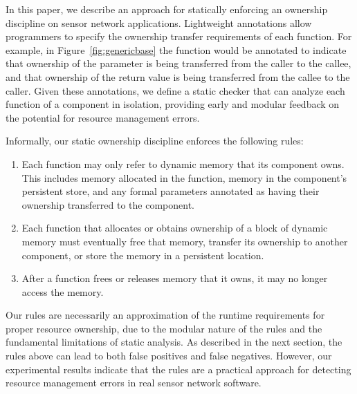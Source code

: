 
%

In this paper, we describe an approach for statically enforcing an
ownership discipline on sensor network applications.  
Lightweight annotations allow programmers to specify the ownership
transfer requirements of each function.  For example, in
Figure~\ref{fig:genericbase} the  function would be
annotated to indicate that ownership of the  parameter
is being transferred from the caller to the callee, and that ownership
of the return value is being transferred from the callee to the
caller.  Given these annotations, we define a static checker that can
analyze each function of a component in isolation, providing early and
modular feedback on the potential for resource management errors.

Informally, our
static ownership discipline enforces the following rules:
%
\begin{enumerate}
%
\item Each function may only refer to dynamic memory that its component owns.
This includes memory allocated in the function, memory in the
component's persistent store, and any formal parameters
annotated as having their ownership transferred to the component.
%
\item Each function that allocates or obtains ownership of a block of
dynamic memory must eventually free that memory, transfer its
ownership to another component, or store the memory in a persistent
location.
%
\item After a function frees or releases memory that it owns, it may
no longer access the memory.
%
\end{enumerate}




Our rules are necessarily an approximation of the runtime
requirements for proper resource ownership, due to the modular nature
of the rules and the fundamental limitations of static analysis.  
As described in the next
section, the rules above can lead to both false positives and false
negatives.  However, our experimental results indicate that the rules
are a practical approach for detecting resource management errors in
real sensor network software.


